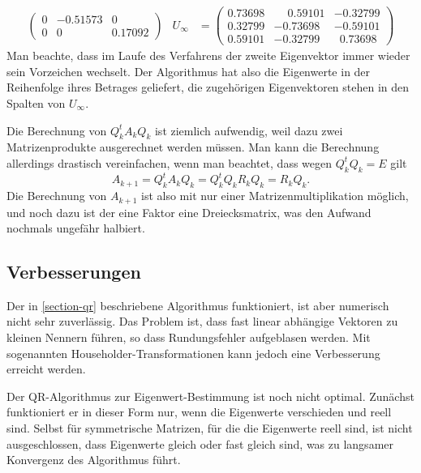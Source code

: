 \begin{beispiel}
\begin{align*}
\begin{pmatrix}
   0& -0.51573&0\\
   0& 0&  0.17092
\end{pmatrix}&
U_\infty&=\begin{pmatrix}
   0.73698& \phantom{-}0.59101& -0.32799\\
   0.32799& -0.73698& -0.59101\\
   0.59101& -0.32799& \phantom{0}0.73698
\end{pmatrix}
\end{align*}
Man beachte, dass im Laufe des Verfahrens der zweite Eigenvektor
immer wieder sein Vorzeichen wechselt.
Der Algorithmus hat also die Eigenwerte in der Reihenfolge
ihres Betrages geliefert, die zugehörigen Eigenvektoren
stehen in den Spalten von $U_\infty$.
\end{beispiel}

Die Berechnung von $Q_k^tA_kQ_k$ ist ziemlich aufwendig, weil dazu
zwei Matrizenprodukte ausgerechnet werden müssen.
Man kann die
Berechnung allerdings drastisch vereinfachen, wenn man beachtet,
dass wegen $Q_k^tQ_k=E$ gilt
\[
A_{k+1}=Q_k^tA_kQ_k=Q_k^tQ_kR_kQ_k=R_kQ_k.
\]
Die Berechnung von $A_{k+1}$ ist also mit nur einer Matrizenmultiplikation
möglich, und noch dazu ist der eine Faktor eine Dreiecksmatrix, was den
Aufwand nochmals ungefähr halbiert.

\subsection{Verbesserungen}
Der in \ref{section-qr} beschriebene Algorithmus funktioniert, ist
aber numerisch nicht sehr zuverlässig.
Das Problem ist, dass fast
linear abhängige Vektoren zu kleinen Nennern führen, so dass
Rundungsfehler aufgeblasen werden.
Mit sogenannten Householder-Transformationen kann jedoch eine 
Verbesserung erreicht werden.

Der QR-Algorithmus zur Eigenwert-Bestimmung ist noch nicht optimal.
Zunächst funktioniert er in dieser Form nur, wenn die Eigenwerte
verschieden und reell sind.
Selbst für symmetrische Matrizen,
für die die Eigenwerte reell sind, ist nicht ausgeschlossen, dass
Eigenwerte gleich oder fast gleich sind, was zu langsamer
Konvergenz des Algorithmus führt.

